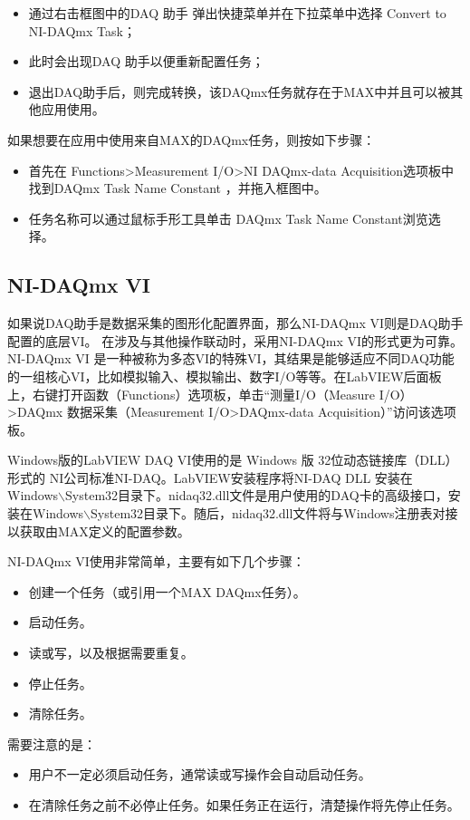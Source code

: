 \begin{itemize}
\item 通过右击框图中的DAQ 助手 弹出快捷菜单并在下拉菜单中选择 Convert to NI-DAQmx Task；
\item 此时会出现DAQ 助手以便重新配置任务；
\item 退出DAQ助手后，则完成转换，该DAQmx任务就存在于MAX中并且可以被其他应用使用。
\end{itemize}

如果想要在应用中使用来自MAX的DAQmx任务，则按如下步骤：
\begin{itemize}
\item 首先在 Functions>Measurement I/O>NI DAQmx-data Acquisition选项板中找到DAQmx Task Name Constant ，并拖入框图中。
\item 任务名称可以通过鼠标手形工具单击 DAQmx Task Name Constant浏览选择。
\end{itemize}



\subsection{NI-DAQmx VI}
如果说DAQ助手是数据采集的图形化配置界面，那么NI-DAQmx VI则是DAQ助手配置的底层VI。
在涉及与其他操作联动时，采用NI-DAQmx VI的形式更为可靠。
NI-DAQmx VI 是一种被称为多态VI的特殊VI，其结果是能够适应不同DAQ功能的一组核心VI，比如模拟输入、模拟输出、数字I/O等等。在LabVIEW后面板上，右键打开函数（Functions）选项板，单击“测量I/O（Measure I/O）>DAQmx 数据采集（Measurement I/O>DAQmx-data Acquisition）”访问该选项板。

Windows版的LabVIEW DAQ VI使用的是 Windows 版 32位动态链接库（DLL）形式的 NI公司标准NI-DAQ。LabVIEW安装程序将NI-DAQ DLL 安装在 Windows$\backslash$System32目录下。nidaq32.dll文件是用户使用的DAQ卡的高级接口，安装在Windows$\backslash$System32目录下。随后，nidaq32.dll文件将与Windows注册表对接以获取由MAX定义的配置参数。

NI-DAQmx VI使用非常简单，主要有如下几个步骤：
\begin{itemize}
\item 创建一个任务（或引用一个MAX DAQmx任务）。
\item 启动任务。
\item 读或写，以及根据需要重复。
\item 停止任务。
\item 清除任务。
\end{itemize}
需要注意的是：
\begin{itemize}
\item 用户不一定必须启动任务，通常读或写操作会自动启动任务。
\item 在清除任务之前不必停止任务。如果任务正在运行，清楚操作将先停止任务。
\end{itemize}




